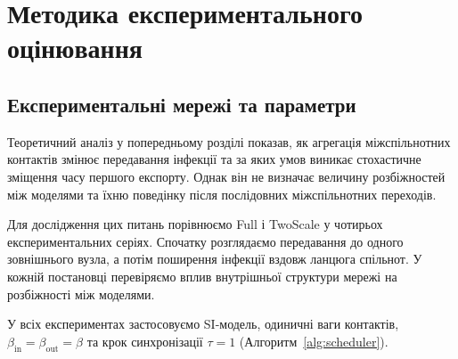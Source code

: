 \documentclass[a4paper,fleqn]{cas-sc}
\begin{document}





\section{Методика експериментального оцінювання}
\label{sec:design}



\subsection{Експериментальні мережі та параметри}


Теоретичний аналіз у попередньому розділі показав,
як агрегація міжспільнотних контактів змінює
передавання інфекції та за яких умов виникає
стохастичне зміщення часу першого експорту.
Однак він не визначає величину розбіжностей
між моделями та їхню поведінку після
послідовних міжспільнотних переходів.

Для дослідження цих питань порівнюємо Full і TwoScale
у чотирьох експериментальних серіях.
Спочатку розглядаємо передавання до одного зовнішнього
вузла, а потім поширення інфекції вздовж ланцюга
спільнот. У кожній постановці перевіряємо вплив
внутрішньої структури мережі на розбіжності між моделями.

У всіх експериментах застосовуємо SI-модель,
одиничні ваги контактів,
$\beta_{\mathrm{in}}=\beta_{\mathrm{out}}=\beta$
та крок синхронізації $\tau=1$
(Алгоритм~\ref{alg:scheduler}).
\end{document}
